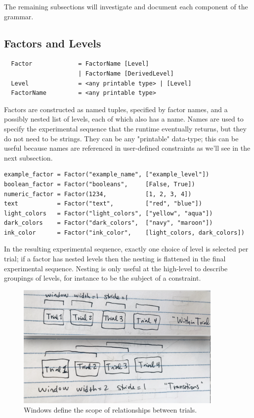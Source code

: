 The remaining subsections will investigate and document each component of the grammar.

\subsection{Factors and Levels}

\begin{verbatim}
  Factor             = FactorName [Level]
                     | FactorName [DerivedLevel]
  Level              = <any printable type> | [Level]
  FactorName         = <any printable type>
\end{verbatim}

Factors are constructed as named tuples, specified by factor names, and a possibly nested list of levels, each of which also has a name. Names are used to specify the experimental sequence that the runtime eventually returns, but they do not need to be strings. They can be any "printable" data-type; this can be useful because names are referenced in user-defined constraints as we'll see in the next subsection.

\begin{verbatim}
example_factor = Factor("example_name", ["example_level"])
boolean_factor = Factor("booleans",     [False, True])
numeric_factor = Factor(1234,           [1, 2, 3, 4])
text           = Factor("text",         ["red", "blue"])
light_colors   = Factor("light_colors", ["yellow", "aqua"])
dark_colors    = Factor("dark_colors",  ["navy", "maroon"])
ink_color      = Factor("ink_color",    [light_colors, dark_colors])
\end{verbatim}

In the resulting experimental sequence, exactly one choice of level is selected per trial; if a factor has nested levels then the nesting is flattened in the final experimental sequence. Nesting is only useful at the high-level to describe groupings of levels, for instance to be the subject of a constraint.

\begin{figure}[t]
    \centerline{\includegraphics[origin=c,width=10cm]{fig_windows}}
    \caption{Windows define the scope of relationships between trials.}%
    \label{fig:windows}%
\end{figure}


